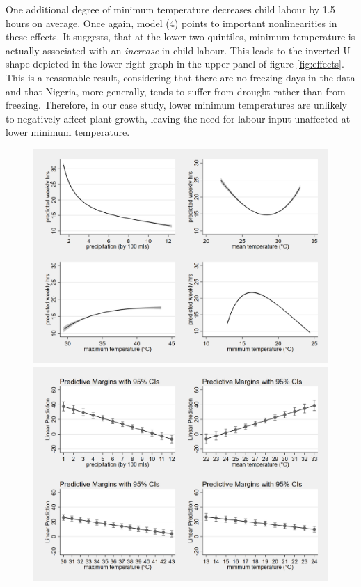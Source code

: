 \documentclass[a4paper,12pt]{article}
\theoremstyle{plain}
\theoremstyle{definition}
\theoremstyle{definition}
\theoremstyle{definition}
\theoremstyle{definition}
\begin{document}
One additional degree of minimum temperature decreases child labour by 1.5 hours on average. Once again, model (4) points to important nonlinearities in these effects. It suggests, that at the lower two quintiles, minimum temperature is actually associated with an \textit{increase} in child labour. This leads to the inverted U-shape depicted in the lower right graph in the upper panel of figure \ref{fig:effects}. This is a reasonable result, considering that there are no freezing days in the data and that Nigeria, more generally, tends to suffer from drought rather than from freezing. Therefore, in our case study, lower minimum temperatures are unlikely to negatively affect plant growth, leaving the need for labour input unaffected at lower minimum temperature.

\begin{figure}[H]
    \centering
    \includegraphics[scale=0.20]{../outputs/predicted_graph.png}
    \includegraphics[scale=0.20]{../outputs/margins_graph.png}

\end{figure}
\end{document}

